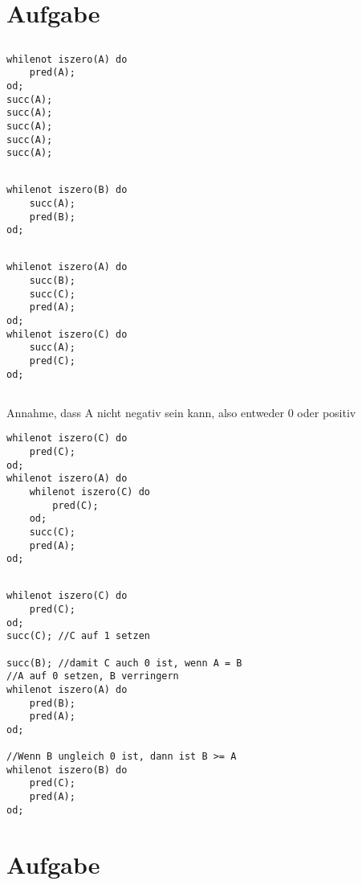 \documentclass[a4paper,12pt,titlepage]{article}
\begin{document}
\section{Aufgabe}
\subsection{}
\begin{lstlisting}[style = code]
whilenot iszero(A) do
	pred(A);
od;
succ(A);
succ(A);
succ(A);
succ(A);
succ(A);
\end{lstlisting}
\subsection{}
\begin{lstlisting}[style = code]
whilenot iszero(B) do
	succ(A);
	pred(B);
od;
\end{lstlisting}
\subsection{}
\begin{lstlisting}[style = code]
whilenot iszero(A) do
	succ(B);
	succ(C);
	pred(A);
od;
whilenot iszero(C) do
	succ(A);
	pred(C);
od;
\end{lstlisting}
\subsection{}
Annahme, dass A nicht negativ sein kann, also entweder 0 oder positiv
\begin{lstlisting}[style = code]
whilenot iszero(C) do
	pred(C);
od;
whilenot iszero(A) do
	whilenot iszero(C) do
		pred(C);
	od;
	succ(C);
	pred(A);
od;
\end{lstlisting}
\subsection{}
\begin{lstlisting}[style = code]
whilenot iszero(C) do
	pred(C);
od;
succ(C); //C auf 1 setzen

succ(B); //damit C auch 0 ist, wenn A = B
//A auf 0 setzen, B verringern
whilenot iszero(A) do
	pred(B);
	pred(A);
od;

//Wenn B ungleich 0 ist, dann ist B >= A
whilenot iszero(B) do
	pred(C);
	pred(A);
od;
\end{lstlisting}
\section{Aufgabe}
\end{document}
